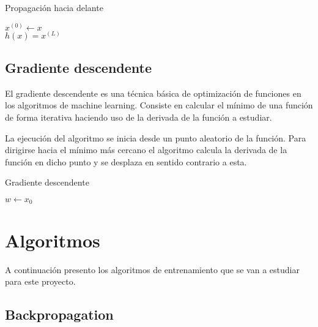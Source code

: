 \begin{algorithm}[H]
   \caption{Propagación hacia delante}
   
   $x^{(0)} \gets x$ \\
   $h(x) = x^{(L)}$
   \label{tab:Feedforward}
\end{algorithm}

\subsection{Gradiente descendente}

El gradiente descendente es una técnica básica de optimización de funciones en los algoritmos de machine learning. Consiste en calcular el mínimo de una función de forma iterativa haciendo uso de la derivada de la función a estudiar. 

La ejecución del algoritmo se inicia desde un punto aleatorio de la función. Para dirigirse hacia el mínimo más cercano el algoritmo calcula la derivada de la función en dicho punto y se desplaza en sentido contrario a esta. 

\begin{algorithm}[H]
   \caption{Gradiente descendente}
   $w \gets x_{0}$\\
\end{algorithm}
\section{Algoritmos}

A continuación presento los algoritmos de entrenamiento que se van a estudiar para este proyecto.

\subsection{Backpropagation} \label{tab:Backprop}

